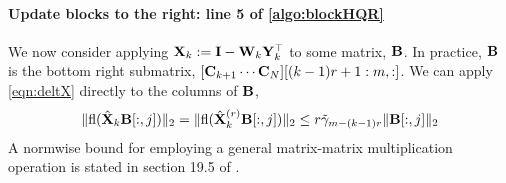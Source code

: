 \paragraph{Update blocks to the right: line 5 of \cref{algo:blockHQR}}
We now consider applying $\mathbf{X}_{k}:=\mathbf{I}-\mathbf{W}_k\mathbf{Y}_k^{\top}$ to some matrix, $\mathbf{B}$.
In practice, $\mathbf{B}$ is the bottom right submatrix, $[\mathbf{C}_{k+1}\cdots \mathbf{C}_{N}][(k-1)r+1:m,:]$.
We can apply \cref{eqn:deltX} directly to the columns of $\mathbf{B}$, 
\begin{align}
	\|\mathrm{fl}(\hat{\mathbf{X}}_k \mathbf{B}[:,j])\|_2 = \|\mathrm{fl}(\hat{\mathbf{X}}_k^{(r)} \mathbf{B}[:,j])\|_2 \leq r\tilde{\gamma}_{m-(k-1)r} \|\mathbf{B}[:,j]\|_2
\end{align}
A normwise bound for employing a general matrix-matrix multiplication operation is stated in section 19.5 of \cite{Higham2002}.
